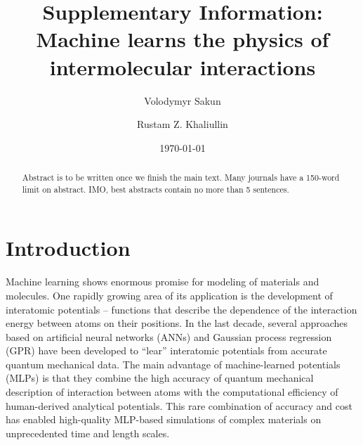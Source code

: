 \documentclass[aps,prl,reprint,amsmath,amssymb,nature]{revtex4-1}
\newcommand*{\MAINTEXT}{}
\begin{document}
\newcommand{\Ang}{\ensuremath{\mathring{\text{A}}}}
\newcommand{\red}{\color{red}}
\newcommand{\blue}{\color{blue}}
\newcommand{\old}{\color{black}}




\title{
\ifdefined\MAINTEXT
\else
Supplementary Information: \\
\fi
Machine learns the physics of intermolecular interactions
}

\author{Volodymyr Sakun}
\author{Rustam Z. Khaliullin}

\date{\today}

\ifdefined\MAINTEXT

\begin{abstract}
\red Abstract is to be written once we finish the main text. Many journals have a 150-word limit on abstract. 
IMO, best abstracts contain no more than 5 sentences. \old
\end{abstract}

\maketitle


\section{Introduction}

Machine learning shows enormous promise for modeling of materials and molecules. 
One rapidly growing area of its application is the development of interatomic potentials -- functions that describe the dependence of the interaction energy between atoms on their positions. 
In the last decade, several approaches based on artificial neural networks (ANNs) and Gaussian process regression (GPR) have been 
developed to ``lear'' interatomic potentials from accurate quantum mechanical data. 
The main advantage of machine-learned potentials (MLPs) is that they combine the high accuracy of quantum mechanical description 
of interaction between atoms with the computational efficiency of human-derived analytical potentials. 
This rare combination of accuracy and cost has enabled high-quality MLP-based simulations of complex materials on unprecedented time and length scales. 
\end{document}
